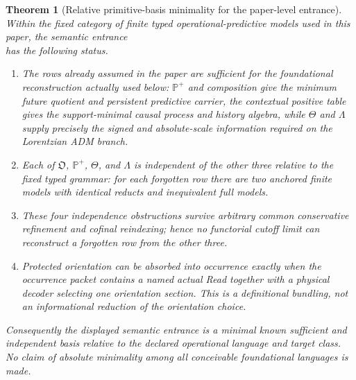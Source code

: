 \documentclass[11pt]{article}
\newtheorem{theorem}{Theorem}[section]
\numberwithin{equation}{section}
\theoremstyle{definition}
\theoremstyle{remark}
\begin{document}
\begin{theorem}[Relative primitive-basis minimality for the paper-level entrance]
\label{thm:supp-relative-primitive-floor}
Within the fixed category of finite typed operational-predictive models used in
this paper, the semantic entrance
\begin{equation}
 [\mathfrak G;\mathfrak O,\mathbb P^+,\Theta,\Lambda]
 \label{eq:supp-relative-floor}
\end{equation}
has the following status.
\begin{enumerate}[label=\textup{(R\arabic*)},leftmargin=3em]
\item The rows already assumed in the paper are sufficient for the foundational
      reconstruction actually used below: $\mathbb P^+$ and composition give
      the minimum future quotient and persistent predictive carrier, the
      contextual positive table gives the support-minimal causal process and
      history algebra, while $\Theta$ and $\Lambda$ supply precisely the signed
      and absolute-scale information required on the Lorentzian ADM branch.
\item Each of $\mathfrak O$, $\mathbb P^+$, $\Theta$, and $\Lambda$ is
      independent of the other three relative to the fixed typed grammar: for
      each forgotten row there are two anchored finite models with identical
      reducts and inequivalent full models.
\item These four independence obstructions survive arbitrary common
      conservative refinement and cofinal reindexing; hence no functorial
      cutoff limit can reconstruct a forgotten row from the other three.
\item Protected orientation can be absorbed into occurrence exactly when the
      occurrence packet contains a named actual Read together with a physical
      decoder selecting one orientation section.  This is a definitional
      bundling, not an informational reduction of the orientation choice.
\end{enumerate}
Consequently the displayed semantic entrance is a minimal known sufficient and
independent basis relative to the declared operational language and target
class.  No claim of absolute minimality among all conceivable foundational
languages is made.
\end{theorem}
\end{document}
